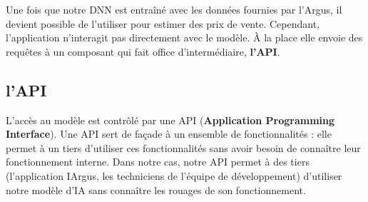 \documentclass[french]{article}
\begin{document}
    Une fois que notre DNN est entraîné avec les données fournies par l'Argus, il devient possible de l'utiliser pour estimer des prix de vente. Cependant, l'application n'interagit pas directement avec le modèle. À la place elle envoie des requêtes à un composant qui fait office d'intermédiaire, \textbf{l'API}.
    \subsection{l'API}
    L'accès au modèle est contrôlé par une API (\textbf{Application Programming Interface}). Une API sert de façade à un ensemble de fonctionnalités : elle permet à un tiers d'utiliser ces fonctionnalités sans avoir besoin de connaître leur fonctionnement interne. Dans notre cas, notre API permet à des tiers (l'application IArgus, les techniciens de l'équipe de développement) d'utiliser notre modèle d'IA sans connaître les rouages de son fonctionnement.
\end{document}
